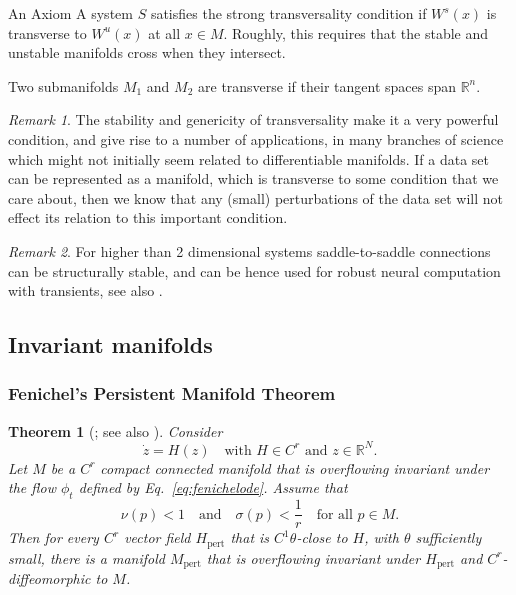 \documentclass{article}
\newtheorem{theorem}{Theorem}
\theoremstyle{definition}
\theoremstyle{remark}
\newtheorem{remark}{Remark}
\newcounter{ct}
\begin{document}
An Axiom A system $S$ satisfies the strong transversality condition if $W^s(x)$ is transverse to $W^u(x)$ at all $x\in M$.
Roughly, this requires that the stable and unstable manifolds cross when they intersect. 

Two submanifolds $M_1$ and $M_2$ are transverse if their tangent spaces span $\mathbb{R}^n$.

\begin{remark}
The stability and genericity of transversality make it a very powerful condition, and give rise to a number of applications, in many branches of science which might not initially seem related to
differentiable manifolds. If a data set can be represented as a manifold, which is transverse to some condition that we care about, then we know that any (small) perturbations of the data set will not effect its relation to this important condition.
\end{remark}


\begin{remark}
For higher than 2 dimensional systems saddle-to-saddle connections can be structurally stable, and can be hence used for robust neural computation with transients, see also \cite{rabinovich2008}.
\end{remark}





\subsection{Invariant manifolds}
\citep{roberts1989invariant,
kalitin2021attractors}

\citep{hirsch1970invariant}
\citep{wiggins1994nhim}
\citep{jones1995gspt}
\citep{kuehn2015multipletimescale}



\subsubsection{Fenichel's Persistent Manifold Theorem}
\begin{theorem}[\citep{fenichel1971persistence}; see also \citep{kuehn2015multipletimescale}]
 Consider
\begin{equation}\label{eq:fenichelode}
\dot{z} = H(z) \quad \text{with } H \in C^r \text{ and } z \in \mathbb{R}^N. 
\end{equation}
Let \( M \) be a \( C^r \) compact connected manifold that is overflowing invariant under the flow \( \phi_t \) defined by Eq.~\ref{eq:fenichelode}. Assume that
\begin{equation}
\nu(p) < 1 \quad \text{and} \quad \sigma(p) < \frac{1}{r} \quad \text{for all } p \in M. 
\end{equation}
Then for every \( C^r \) vector field \( H_{\text{pert}} \) that is \( C^1 \theta \)-close to \( H \), with \( \theta \) sufficiently small, there is a manifold \( M_{\text{pert}} \) that is overflowing invariant under \( H_{\text{pert}} \) and \( C^r \)-diffeomorphic to \( M \).
\end{theorem}
\end{document}
